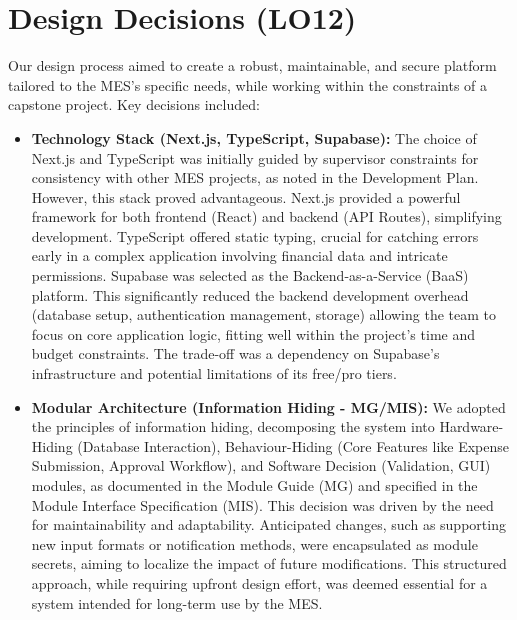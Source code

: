 \documentclass{article}
\begin{document}
\section{Design Decisions (LO12)}


Our design process aimed to create a robust, maintainable, and secure platform tailored to the MES's specific needs, while working within the constraints of a capstone project. Key decisions included:

\begin{itemize}
    \item \textbf{Technology Stack (Next.js, TypeScript, Supabase):}
        The choice of Next.js and TypeScript was initially guided by supervisor constraints for consistency with other MES projects, as noted in the Development Plan. However, this stack proved advantageous. Next.js provided a powerful framework for both frontend (React) and backend (API Routes), simplifying development. TypeScript offered static typing, crucial for catching errors early in a complex application involving financial data and intricate permissions. Supabase was selected as the Backend-as-a-Service (BaaS) platform. This significantly reduced the backend development overhead (database setup, authentication management, storage) allowing the team to focus on core application logic, fitting well within the project's time and budget constraints. The trade-off was a dependency on Supabase's infrastructure and potential limitations of its free/pro tiers.

    \item \textbf{Modular Architecture (Information Hiding - MG/MIS):}
        We adopted the principles of information hiding, decomposing the system into Hardware-Hiding (Database Interaction), Behaviour-Hiding (Core Features like Expense Submission, Approval Workflow), and Software Decision (Validation, GUI) modules, as documented in the Module Guide (MG) and specified in the Module Interface Specification (MIS). This decision was driven by the need for maintainability and adaptability. Anticipated changes, such as supporting new input formats or notification methods, were encapsulated as module secrets, aiming to localize the impact of future modifications. This structured approach, while requiring upfront design effort, was deemed essential for a system intended for long-term use by the MES.


\end{itemize}
\end{document}
